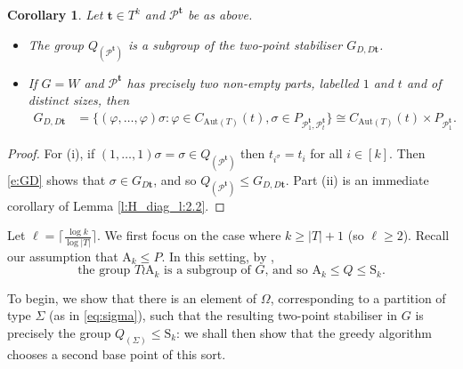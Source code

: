 \documentclass[twoside,a4paper,reqno,11pt]{amsart}
\newcommand{\<}{\langle}
\renewcommand{\>}{\rangle}
\newcommand{\leqs}{\leqslant}
\newcommand{\geqs}{\geqslant}
\def\le{\leqs}
\newcommand{\Aut}{\mathrm{Aut}}
\newcommand{\Sn}{\mathrm{S}}
\newcommand{\An}{\mathrm{A}}
\newtheorem{cor}[thm]{Corollary}
\theoremstyle{definition}
\begin{document}

\begin{cor}
	\label{c:stab_2-parts}
	Let $\mathbf{t} \in T^k$ and $\mathcal{P}^{\mathbf{t}}$ be as above. 
    \begin{itemize}\addtolength{\itemsep}{0.2\baselineskip}
        \item[{\rm (i)}] The group $Q_{(\mathcal{P}^{\mathbf{t}})}$ is a subgroup of the two-point stabiliser $G_{D , D\mathbf{t}}$.
        \item[{\rm (ii)}] If $G = W$ and $\mathcal{P}^{\mathbf{t}}$ has precisely two non-empty parts, labelled $1$ and $t$ and of distinct sizes, then 
	\begin{equation*}
	\begin{aligned}
	G_{D, D\mathbf{t}} &= \{(\varphi,\dots,\varphi)\sigma: \varphi\in C_{\Aut(T)}(t), \sigma\in P_{\mathcal{P}_1^{\mathbf{t}}, \mathcal{P}_t^{\mathbf{t}}}\} \cong C_{\Aut(T)}(t)\times P_{\mathcal{P}_1^{\mathbf{t}}}.
	\end{aligned}
	\end{equation*}
    \end{itemize}
\end{cor}

\begin{proof}
    For (i), if $(1,\dots,1)\sigma = \sigma \in Q_{(\mathcal{P}^{\mathbf{t}})}$ then $t_{i^\sigma} = t_i$ for all $i \in [k]$. Then \eqref{e:GD} shows that $\sigma\in G_{D\mathbf{t}}$, and so $Q_{(\mathcal{P}^{\mathbf{t}})} \leqs G_{D,D\mathbf{t}}$. Part (ii) is an immediate corollary of Lemma \ref{l:H_diag_l:2.2}.
\end{proof}


Let $\ell = \lceil\frac{\log k}{\log |T|}\rceil$. We first focus on the case where $k\geqs |T|+1$ (so $\ell\geqs 2$). Recall our assumption that $\An_k \le P$. In this setting, by \cite[Corollary 2.6]{H_diag}, 
\begin{equation}\label{eq:wreath}
    \mbox{the group $T \wr \An_k$ is a subgroup of $G$, and so $\An_k \le Q \le \Sn_k$.}
\end{equation}

To begin, we show that there is an element of $\Omega$, corresponding to a partition of type $\Sigma$ (as in \eqref{eq:sigma}), such that the resulting two-point stabiliser in $G$ is precisely the group $Q_{(\Sigma)} \leqs \Sn_k$: we shall then show  that %
the greedy algorithm chooses a second base point of this sort. 
\end{document}
